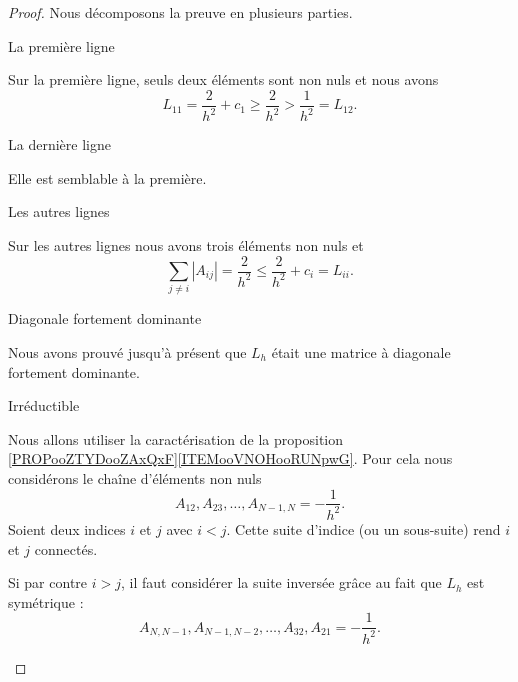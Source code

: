 \begin{proof}
    Nous décomposons la preuve en plusieurs parties.
    \begin{subproof}
        \item[La première ligne]

            Sur la première ligne, seuls deux éléments sont non nuls et nous avons
            \begin{equation}
                L_{11}=\frac{ 2 }{ h^2 }+c_1\geq \frac{ 2 }{ h^2 }>\frac{1}{ h^2 }=L_{12}.
            \end{equation}
            
        \item[La dernière ligne]

            Elle est semblable à la première.
        
        \item[Les autres lignes]

            Sur les autres lignes nous avons trois éléments non nuls et
            \begin{equation}
                \sum_{j\neq i}| A_{ij} |=\frac{ 2 }{ h^2 }\leq \frac{ 2 }{ h^2 }+c_i=L_{ii}.
            \end{equation}
            
        \item[Diagonale fortement dominante]

            Nous avons prouvé jusqu'à présent que \( L_h\) était une matrice à diagonale fortement dominante.

        \item[Irréductible]

            Nous allons utiliser la caractérisation de la proposition \ref{PROPooZTYDooZAxQxF}\ref{ITEMooVNOHooRUNpwG}. Pour cela nous considérons le chaîne d'éléments non nuls
            \begin{equation}
                A_{12}, A_{23},\ldots, A_{N-1,N}=-\frac{1}{ h^2 }.
            \end{equation}
            Soient deux indices \( i\) et \( j\) avec \( i<j\). Cette suite d'indice (ou un sous-suite) rend \( i\) et \( j\) connectés.

            Si par contre \( i>j\), il faut considérer la suite inversée grâce au fait que \( L_h\) est symétrique :
            \begin{equation}
                A_{N,N-1},A_{N-1,N-2},\ldots, A_{32}, A_{21}=-\frac{ 1 }{ h^2 }.
            \end{equation}

    \end{subproof}
\end{proof}

